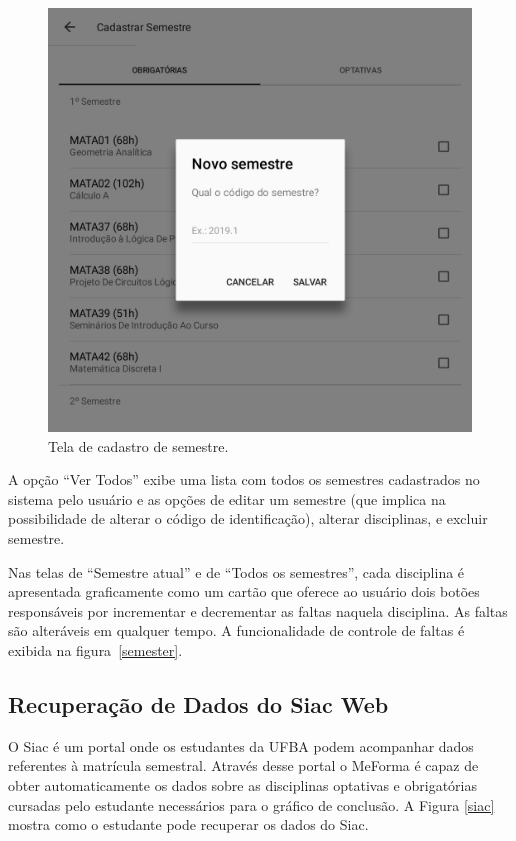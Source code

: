 \begin{figure}[H]
	   \centering
	   		\includegraphics[scale=0.25]{pics/c3/11-newsemester.png}
	   \caption{Tela de cadastro de semestre.}
	   \label{newsemester}
\end{figure}

A opção ``Ver Todos'' exibe uma lista com todos os semestres cadastrados no sistema pelo usuário e as opções de editar um semestre (que implica na possibilidade de alterar o código de identificação), alterar disciplinas, e excluir semestre.

Nas telas de ``Semestre atual'' e de ``Todos os semestres'', cada disciplina é apresentada graficamente como um cartão que oferece ao usuário dois botões responsáveis por incrementar e decrementar as faltas naquela disciplina. As faltas são alteráveis em qualquer tempo. A funcionalidade de controle de faltas é exibida na figura~\ref{semester}.

\subsection{Recuperação de Dados do Siac Web}
O Siac é um portal onde os estudantes da UFBA podem acompanhar dados referentes à matrícula semestral. Através desse portal o MeForma é capaz de obter automaticamente os dados sobre as disciplinas optativas e obrigatórias cursadas pelo estudante necessários para o gráfico de conclusão. A Figura \ref{siac} mostra como o estudante pode recuperar os dados do Siac.

